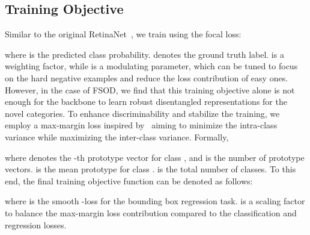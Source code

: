 \documentclass[10pt,twocolumn,letterpaper]{article}
\begin{document}
\subsection{Training Objective}

Similar to the original RetinaNet~\cite{RetinaNet}, we train using the focal loss:

where  is the predicted class probability.  denotes the ground truth label.  is a weighting factor, while  is a modulating parameter, which can be tuned to focus on the hard negative examples and reduce the loss contribution of easy ones. However, in the case of FSOD, we find that this training objective alone is not enough for the backbone to learn robust disentangled representations for the novel categories. To enhance discriminability and stabilize the training, we employ a max-margin loss inspired by~\cite{CME} aiming to minimize the intra-class variance while maximizing the inter-class variance. Formally, 

where  denotes the -th prototype vector for class , and  is the number of prototype vectors.  is the mean prototype for class .  is the total number of classes. To this end, the final training objective function can be denoted as follows:

where  is the smooth -loss for the bounding box regression task.  is a scaling factor to balance the max-margin loss contribution compared to the classification and regression losses.
\end{document}
